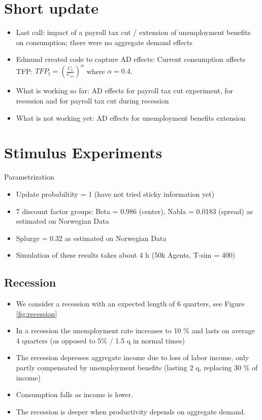 \documentclass[]{article}
\begin{document}
\section{Short update}
\begin{itemize}
	\item Last call: impact of a payroll tax cut / extension of unemployment benefits on consumption; there were no aggregate demand effects
	\item Edmund created code to capture AD effects: Current consumption affects TFP: $TFP_t = \left(\frac{C_t}{C_{ss}}\right)^\alpha$ where $\alpha = 0.4$.
	\item What is working so far: AD effects for payroll tax cut experiment, for recession and for payroll tax cut during recession
	\item What is not working yet: AD effects for unemployment benefits extension
\end{itemize}

\section{Stimulus Experiments}

Parametrization
\begin{itemize}
	\item Update probabiltity = 1 (have not tried sticky information yet)
	\item 7 discount factor groups: Beta = 0.986 (center), Nabla = 0.0183 (spread) as estimated on Norwegian Data
	\item Splurge = 0.32 as estimated on Norwegian Data
	\item Simulation of these results takes about 4 h (50k Agents, T-sim = 400)
\end{itemize}	

\subsection{Recession}

\begin{itemize}
	\item We consider a recession with an expected length of 6 quarters, see Figure \ref{fig:recession}
	\item In a recession the unemployment rate increases to 10 \% and lasts on average 4 quarters (as opposed to 5\% / 1.5 q in normal times)
	\item The recession depresses aggregate income due to loss of labor income, only partly compensated by unemployment benefits (lasting 2 q, replacing 30 \% of income)
	\item Consumption falls as income is lower.
	\item The recession is deeper when productivity depends on aggregate demand.
\end{itemize}
\end{document}
